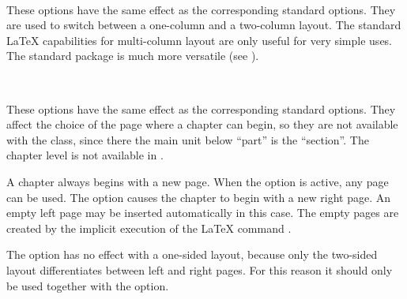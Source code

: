 \begin{Declaration}
  \\
\end{Declaration}%
%
These options have the same effect as the corresponding standard
options. They are used to switch between a one-column and a two-column
layout. The standard \LaTeX{} capabilities for multi-column layout are
only useful for very simple uses. The standard package
 is much more versatile (see
\cite{package:multicol}).
%
 


\begin{Declaration}
  \\
\end{Declaration}%
%
%
These options have the
same effect as the corresponding standard options. They affect the
choice of the page where a chapter can begin,
so they are not available with the  class, since there
the main unit below ``part'' is the ``section''. The chapter level is
not available in .

A chapter always begins with a new page. When the option
 is active, any page can be used. The option
 causes the chapter to begin with a new right page.
An empty left page may be inserted automatically in this case. The
empty pages are created by the implicit execution of the \LaTeX{}
command .

The option  has no effect with a one-sided layout,
because only the two-sided layout differentiates between left and
right pages. For this reason it should only be used together with the
 option.
%
%


